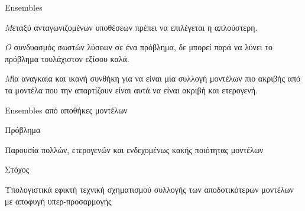 \documentclass{beamer}
\begin{document}
  \begin{frame}{Ensembles}
  	\begin{flushleft}
  		{\small \textit 
  			Μεταξύ ανταγωνιζομένων υποθέσεων πρέπει να επιλέγεται η απλούστερη.}
  	\end{flushleft}

  	\begin{flushleft}
  		{\small \textit 
  			Ο συνδυασμός σωστών λύσεων σε ένα πρόβλημα, δε μπορεί παρά να λύνει το πρόβλημα τουλάχιστον εξίσου καλά.}
  	\end{flushleft}
  	\begin{flushleft}
  		{\small \textit 
  			Μία αναγκαία και ικανή συνθήκη για να είναι μία συλλογή μοντέλων πιο ακριβής από τα μοντέλα που την απαρτίζουν είναι αυτά να είναι ακριβή και ετερογενή.}
  	\end{flushleft}
  \end{frame}
   \begin{frame}{Ensembles από αποθήκες μοντέλων}
   	\begin{minipage}[t]{.3\textwidth}  		
   		Πρόβλημα
   		\vspace{4ex}
   	\end{minipage}%
   	\begin{minipage}[t]{.6\textwidth}
   		Παρουσία πολλών, ετερογενών και ενδεχομένως κακής ποιότητας μοντέλων 	
   		\vspace{4ex}
   	\end{minipage}
   	\begin{minipage}[t]{.3\textwidth}  		
   		Στόχος
   		\vspace{4ex}
   	\end{minipage}%
   	\begin{minipage}[t]{.6\textwidth}  
   		Υπολογιστικά εφικτή τεχνική σχηματισμού συλλογής των αποδοτικότερων μοντέλων με αποφυγή υπερ-προσαρμογής 		
   		\vspace{4ex} 
   	\end{minipage}
   \end{frame}
\end{document}
